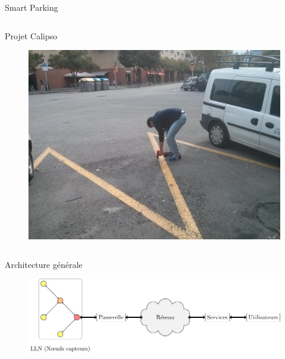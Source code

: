 \begin{frame}{Smart Parking}
\begin{columns}
\begin{column}{0.48\textwidth}
\begin{alertblock}{Projet Calipso}
\begin{itemize}
          \end{itemize}
        \end{alertblock}
        \begin{figure}
          \centering
          \includegraphics[width=.7\textwidth]{figures/installation_smart_parking.jpg}
        \end{figure}
      \end{column}
  \end{columns}
\end{frame}

\begin{frame}{Architecture générale}
  \begin{figure}
    \centering
    \includegraphics[scale=.75]{figures/architecture_general_slides.pdf}
  \end{figure}


\end{frame}


